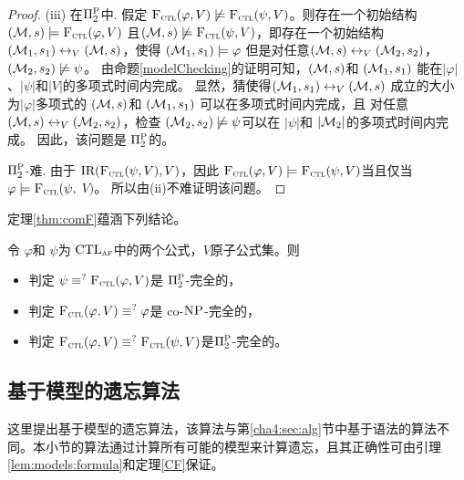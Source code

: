 \begin{proof}
	(iii) 在$\Pi_2^{\textsc{P}}$中. 假定 ${\textsc{F}_{\textsc{ctl}}}(\varphi, V) \not \models {\textsc{F}_{\textsc{ctl}}}(\psi, V)$。则存在一个初始结构 $({\cal M},s) 
	\models {\textsc{F}_{\textsc{ctl}}}(\varphi, V)$ 且$({\cal M},s) \not \models {\textsc{F}_{\textsc{ctl}}}(\psi, V)$，即存在一个初始结构$({\cal M}_1,s_1) \leftrightarrow_V ({\cal M},s)$，使得 $({\cal M}_1, s_1) \models \varphi$ 但是对任意$({\cal M}, s) \leftrightarrow_V ({\cal M}_2,s_2)$，$({\cal M}_2, s_2) \not \models \psi$。
	由命题\ref{modelChecking}的证明可知，$({\cal M},s)$和 $({\cal M}_1,s_1)$ 能在$|\varphi|$、$|\psi|$和$|V|$的多项式时间内完成。 
	显然，猜使得$({\cal M}_1,s_1) \leftrightarrow_V ({\cal M},s)$ 成立的大小为$|\varphi|$多项式的 $({\cal M},s)$和 $({\cal M}_1,s_1)$ 可以在多项式时间内完成，且 对任意 $({\cal M}, s) \leftrightarrow_V ({\cal M}_2,s_2)$，检查 $({\cal M}_2,s_2) \not \models \psi$可以在 $|\psi|$和 $|{\cal M}_2|$的多项式时间内完成。
	因此，该问题是 $\Pi_2^{\textsc{P}}$的。
	
	$\Pi_2^{\textsc{P}}$-难. 由于 $\textrm{IR}({\textsc{F}_{\textsc{ctl}}}(\psi, V), V)$，因此 ${\textsc{F}_{\textsc{ctl}}}(\varphi, V) \models {\textsc{F}_{\textsc{ctl}}}(\psi, V)$当且仅当 $\varphi \models {\textsc{F}_{\textsc{ctl}}}(\psi,$ $V)$。 所以由(ii)不难证明该问题。
\end{proof}



定理\ref{thm:comF}蕴涵下列结论。
\begin{corollary}
	令 $\varphi$和 $\psi$为 $\textrm{CTL}_{\textsc{a} \textsc{f}}$中的两个公式，$V$原子公式集。则
	\begin{itemize}
		\item[(i)] 判定 $\psi \equiv^?{\textsc{F}_{\textsc{ctl}}}(\varphi, V)$是 $\Pi_2^{\textsc{P}}$-完全的，
		\item[(ii)] 判定 ${\textsc{F}_{\textsc{ctl}}}(\varphi, V) \equiv^? \varphi$是 co-$\textsc{NP}$-完全的，
		\item[(iii)] 判定 ${\textsc{F}_{\textsc{ctl}}}(\varphi, V) \equiv^? {\textsc{F}_{\textsc{ctl}}}(\psi, V)$是$\Pi_2^{\textsc{P}}$-完全的。
	\end{itemize}
\end{corollary}


\subsection{基于模型的遗忘算法}\label{chapter06:sec:algm}
这里提出基于模型的遗忘算法，该算法与第\ref{cha4:sec:alg}节中基于语法的算法不同。本小节的算法通过计算所有可能的模型来计算遗忘，且其正确性可由引理\ref{lem:models:formula}和定理\ref{CF}保证。

